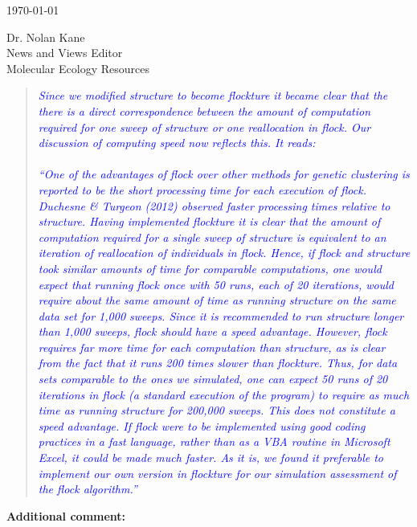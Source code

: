 \documentclass[11pt]{letter}
\newcommand{\reply}[1]{\begin{quotation}\small\sl\textcolor{blue}{#1}\end{quotation}}
\begin{document}
\begin{letter}{ \today 

Dr. Nolan Kane\\
News and Views Editor\\
Molecular Ecology Resources \\
}
\reply{Since we modified {\sc structure} to become {\sc flockture} it became clear that the 
there is a direct correspondence between the amount of computation required for one sweep of
{\sc structure} or one reallocation in {\sc flock}. Our discussion of computing speed now reflects
this.  It reads: \\
\mbox{}\\
``One of the advantages of {\sc flock} over other methods for genetic clustering
is reported to be the short processing time for each execution of {\sc flock}.
Duchesne \& Turgeon (2012) observed faster processing times relative to {\sc structure}.
Having implemented {\sc flockture} it is clear that the amount of computation required for a
single sweep of {\sc structure} is equivalent to an iteration of reallocation of individuals
in {\sc flock}.
Hence, if {\sc flock} and {\sc structure} took similar amounts of time for comparable
computations, one would expect that running flock once with 50 runs, each of 20 iterations,
would require about the same amount of time as running {\sc structure} on the same
data set for 1,000 sweeps.  Since it is recommended to run {\sc structure} longer than 1,000 sweeps, {\sc flock} should have a speed advantage. However, {\sc flock} requires far more 
time for each computation
than {\sc structure}, as is clear from the fact that it runs 200 times slower than 
{\sc flockture}.  Thus, for data sets comparable to the ones we simulated, one can expect
50 runs of 20 iterations in {\sc flock} (a standard execution of the program) to require as
much time as running {\sc structure} for 200,000 sweeps. This does not constitute
a speed advantage.
If {\sc flock} were to be implemented using good coding practices in a fast language,
rather than as a VBA routine in Microsoft Excel,
it could be made much faster. As it is, we found it preferable to implement our own version
in {\sc flockture} for our simulation assessment of the {\sc flock} algorithm.''} 


{\bf Additional comment:}


\end{letter}
\end{document}
